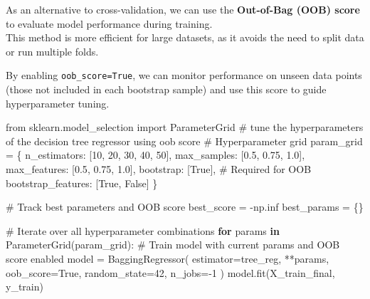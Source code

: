 \documentclass[
  letterpaper,
  DIV=11,
  numbers=noendperiod]{scrreprt}
\newenvironment{Shaded}{\begin{snugshade}}{\end{snugshade}}
\newcommand{\CommentTok}[1]{\textcolor[rgb]{0.37,0.37,0.37}{#1}}
\newcommand{\ControlFlowTok}[1]{\textcolor[rgb]{0.00,0.23,0.31}{\textbf{#1}}}
\newcommand{\DecValTok}[1]{\textcolor[rgb]{0.68,0.00,0.00}{#1}}
\newcommand{\FloatTok}[1]{\textcolor[rgb]{0.68,0.00,0.00}{#1}}
\newcommand{\ImportTok}[1]{\textcolor[rgb]{0.00,0.46,0.62}{#1}}
\newcommand{\KeywordTok}[1]{\textcolor[rgb]{0.00,0.23,0.31}{\textbf{#1}}}
\newcommand{\NormalTok}[1]{\textcolor[rgb]{0.00,0.23,0.31}{#1}}
\newcommand{\OperatorTok}[1]{\textcolor[rgb]{0.37,0.37,0.37}{#1}}
\newcommand{\StringTok}[1]{\textcolor[rgb]{0.13,0.47,0.30}{#1}}
\newcommand{\VariableTok}[1]{\textcolor[rgb]{0.07,0.07,0.07}{#1}}
\begin{document}
As an alternative to cross-validation, we can use the \textbf{Out-of-Bag
(OOB) score} to evaluate model performance during training.\\
This method is more efficient for large datasets, as it avoids the need
to split data or run multiple folds.

By enabling \texttt{oob\_score=True}, we can monitor performance on
unseen data points (those not included in each bootstrap sample) and use
this score to guide hyperparameter tuning.

\begin{Shaded}
\begin{Highlighting}[]
\ImportTok{from}\NormalTok{ sklearn.model\_selection }\ImportTok{import}\NormalTok{ ParameterGrid}
\CommentTok{\# tune the hyperparameters of the decision tree regressor using oob score}
\CommentTok{\# Hyperparameter grid}
\NormalTok{param\_grid }\OperatorTok{=}\NormalTok{ \{}
    \StringTok{\textquotesingle{}n\_estimators\textquotesingle{}}\NormalTok{: [}\DecValTok{10}\NormalTok{, }\DecValTok{20}\NormalTok{, }\DecValTok{30}\NormalTok{, }\DecValTok{40}\NormalTok{, }\DecValTok{50}\NormalTok{],}
    \StringTok{\textquotesingle{}max\_samples\textquotesingle{}}\NormalTok{: [}\FloatTok{0.5}\NormalTok{, }\FloatTok{0.75}\NormalTok{, }\FloatTok{1.0}\NormalTok{],}
    \StringTok{\textquotesingle{}max\_features\textquotesingle{}}\NormalTok{: [}\FloatTok{0.5}\NormalTok{, }\FloatTok{0.75}\NormalTok{, }\FloatTok{1.0}\NormalTok{],}
    \StringTok{\textquotesingle{}bootstrap\textquotesingle{}}\NormalTok{: [}\VariableTok{True}\NormalTok{],  }\CommentTok{\# Required for OOB}
    \StringTok{\textquotesingle{}bootstrap\_features\textquotesingle{}}\NormalTok{: [}\VariableTok{True}\NormalTok{, }\VariableTok{False}\NormalTok{]}
\NormalTok{\}}

\CommentTok{\# Track best parameters and OOB score}
\NormalTok{best\_score }\OperatorTok{=} \OperatorTok{{-}}\NormalTok{np.inf}
\NormalTok{best\_params }\OperatorTok{=}\NormalTok{ \{\}}

\CommentTok{\# Iterate over all hyperparameter combinations}
\ControlFlowTok{for}\NormalTok{ params }\KeywordTok{in}\NormalTok{ ParameterGrid(param\_grid):}
    \CommentTok{\# Train model with current params and OOB score enabled}
\NormalTok{    model }\OperatorTok{=}\NormalTok{ BaggingRegressor(}
\NormalTok{        estimator}\OperatorTok{=}\NormalTok{tree\_reg,}
        \OperatorTok{**}\NormalTok{params,}
\NormalTok{        oob\_score}\OperatorTok{=}\VariableTok{True}\NormalTok{,}
\NormalTok{        random\_state}\OperatorTok{=}\DecValTok{42}\NormalTok{,}
\NormalTok{        n\_jobs}\OperatorTok{={-}}\DecValTok{1}
\NormalTok{    )}
\NormalTok{    model.fit(X\_train\_final, y\_train)}
    

\end{Highlighting}
\end{Shaded}
\end{document}
